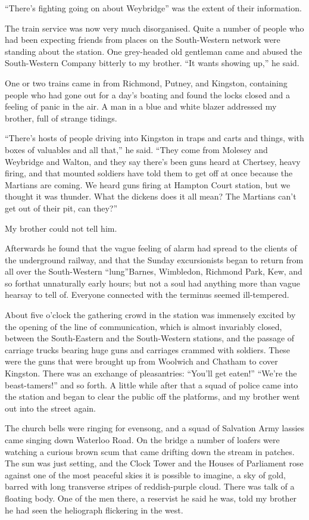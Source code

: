 ``There's fighting going on about Weybridge'' was the extent of their
information.

The train service was now very much disorganised. Quite a number of
people who had been expecting friends from places on the
South-Western network were standing about the station. One
grey-headed old gentleman came and abused the South-Western Company
bitterly to my brother. ``It wants showing up,'' he said.

One or two trains came in from Richmond, Putney, and Kingston,
containing people who had gone out for a day's boating and found
the locks closed and a feeling of panic in the air. A man in a blue
and white blazer addressed my brother, full of strange tidings.

``There's hosts of people driving into Kingston in traps and carts
and things, with boxes of valuables and all that,'' he said. ``They
come from Molesey and Weybridge and Walton, and they say there's
been guns heard at Chertsey, heavy firing, and that mounted
soldiers have told them to get off at once because the Martians are
coming. We heard guns firing at Hampton Court station, but we
thought it was thunder. What the dickens does it all mean? The
Martians can't get out of their pit, can they?''

My brother could not tell him.

Afterwards he found that the vague feeling of alarm had spread to
the clients of the underground railway, and that the Sunday
excursionists began to return from all over the South-Western
``lung''\dash{}Barnes, Wimbledon, Richmond Park, Kew, and so forth\dash{}at
unnaturally early hours; but not a soul had anything more than
vague hearsay to tell of. Everyone connected with the terminus
seemed ill-tempered.

About five o'clock the gathering crowd in the station was immensely
excited by the opening of the line of communication, which is
almost invariably closed, between the South-Eastern and the
South-Western stations, and the passage of carriage trucks bearing
huge guns and carriages crammed with soldiers. These were the guns
that were brought up from Woolwich and Chatham to cover Kingston.
There was an exchange of pleasantries: ``You'll get eaten!'' ``We're
the beast-tamers!'' and so forth. A little while after that a squad
of police came into the station and began to clear the public off
the platforms, and my brother went out into the street again.

The church bells were ringing for evensong, and a squad of
Salvation Army lassies came singing down Waterloo Road. On the
bridge a number of loafers were watching a curious brown scum that
came drifting down the stream in patches. The sun was just setting,
and the Clock Tower and the Houses of Parliament rose against one
of the most peaceful skies it is possible to imagine, a sky of
gold, barred with long transverse stripes of reddish-purple cloud.
There was talk of a floating body. One of the men there, a
reservist he said he was, told my brother he had seen the
heliograph flickering in the west.


